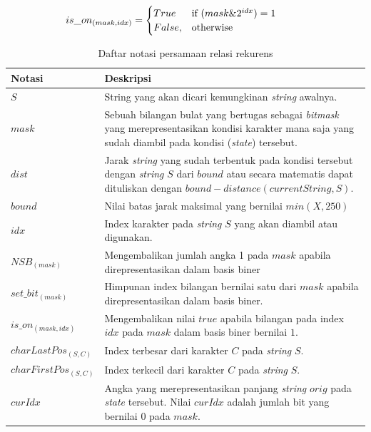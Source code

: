 \documentclass[a4paper]{IEEEtran}
\begin{document}
\begin{equation*}
is\_on_{(mask, idx)} =
\begin{cases}
True& \text{if } \parbox[t]{0.3\linewidth}{($mask \& 2^{idx}) = 1$}\\
False,& \text{otherwise}
\end{cases}
\end{equation*}

\begin{table}
	\centering
	\begin{tabular} {|p{3cm}|p{5cm}|} \hline
		Notasi & Deskripsi\\ \hline
		$ S $ & String yang akan dicari kemungkinan \textit{string} awalnya.\\ \hline
		$ mask $ & Sebuah bilangan bulat yang bertugas sebagai \textit{bitmask} yang merepresentasikan kondisi karakter mana saja yang sudah diambil pada kondisi (\textit{state}) tersebut.\\ \hline
		$ dist $ & Jarak \textit{string} yang sudah terbentuk pada kondisi tersebut dengan \textit{string} $ S $ dari $ bound $ atau secara matematis dapat dituliskan dengan $ bound - distance(currentString, S) $.\\ \hline
		$ bound $ & Nilai batas jarak maksimal yang bernilai $ min(X, 250) $\\ \hline
		$ idx $ & Index karakter pada \textit{string} $ S $ yang akan diambil atau digunakan.\\ \hline
		$ NSB_{(mask)} $ & Mengembalikan jumlah angka 1 pada $ mask $ apabila direpresentasikan dalam basis biner\\ \hline
		$ set\_bit_{(mask)} $ & Himpunan index bilangan bernilai satu dari $ mask $ apabila direpresentasikan dalam basis biner.\\ \hline
		$ is\_on_{(mask, idx)} $ & Mengembalikan nilai $ true $ apabila bilangan pada index $ idx $ pada $ mask $ dalam basis biner bernilai $ 1 $.\\ \hline
		$ charLastPos_{(S, C)} $ & Index terbesar dari karakter $ C $ pada \textit{string} $ S $.\\ \hline
		$ charFirstPos_{(S, C)} $ & Index terkecil dari karakter $ C $ pada \textit{string} $ S $.\\ \hline
		$ curIdx $ & Angka yang merepresentasikan panjang \textit{string} $ orig $ pada \textit{state} tersebut. Nilai $ curIdx $ adalah jumlah bit yang bernilai $ 0 $ pada $ mask $.\\ \hline
	\end{tabular}\caption{Daftar notasi persamaan relasi rekurens}
	\label{tab:daftar_notasi}
\end{table}
\end{document}
